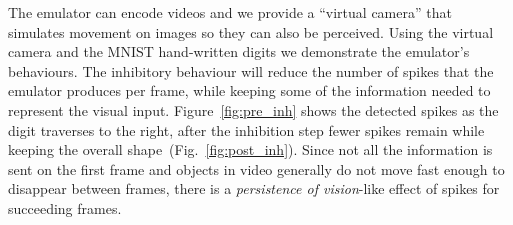 \documentclass[conference]{IEEEtran}
\begin{document}
The emulator can encode videos and we provide a ``virtual camera'' that simulates movement on images so they can also be perceived. Using the virtual camera and the MNIST hand-written digits we demonstrate the emulator's behaviours. The inhibitory behaviour will reduce the number of spikes that the emulator produces per frame, while keeping some of the information needed to represent the visual input. Figure~\ref{fig:pre_inh} shows the detected spikes as the digit traverses to the right, after the inhibition step fewer spikes remain while keeping the overall shape~(Fig.~\ref{fig:post_inh}). Since not all the information is sent on the first frame and objects in video generally do not move fast enough to disappear between frames, there is a \textit{persistence of vision}-like effect of spikes for succeeding frames.
\end{document}
